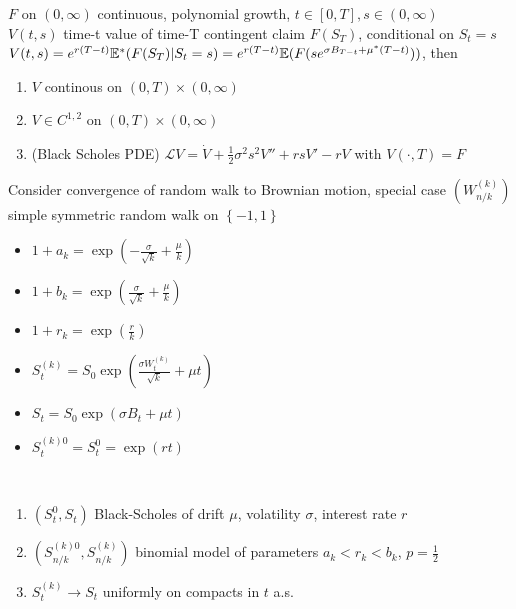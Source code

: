 \begin{prop}
    $F$ on $(0, \infty)$ continuous, polynomial growth, $t \in [0, T], s \in (0, \infty)$ \\
    $V(t, s)$ time-t value of time-T contingent claim $F(S_T)$, conditional on $S_t = s$\\
    $V(t, s) = e^{r (T - t)}\mathbb{E}^*(F(S_T)|S_t = s) = e^{r(T - t)} \mathbb{E}(F(se^{\sigma B_{T-t} + \mu^*(T-t)}))$, then
    \begin{enumerate}
        \item $V$ continous on $(0, T) \times (0, \infty)$
        \item $V \in C^{1,2}$ on $(0, T) \times (0, \infty)$
        \item (Black Scholes PDE) $\mathcal{L}V = \dot{V} + \frac{1}{2} \sigma^2 s^2 V'' + rsV' - rV$ with $V(\cdot, T) = F$
    \end{enumerate}
\end{prop}

\begin{setting}
    Consider convergence of random walk to Brownian motion, special case $(W_{n/k}^{(k)})$ simple symmetric random walk on $\left\{ -1, 1 \right\}$
\end{setting}

\begin{itemize}
    \item $1 + a_k = \exp\left( -\frac{\sigma}{\sqrt{k}} + \frac{\mu}{k} \right)$
    \item $1 + b_k = \exp\left( \frac{\sigma}{\sqrt{k}} + \frac{\mu}{k} \right)$
    \item $1 + r_k = \exp\left( \frac{r}{k} \right)$
    \item $S_t^{(k)} = S_0\exp\left( \frac{\sigma W_t^{(k)}}{\sqrt{k}} + \mu t \right)$
    \item $S_t = S_0 \exp\left( \sigma B_t + \mu t \right)$
    \item $S_t^{(k)0} = S_t^0 = \exp(rt)$
\end{itemize}

\begin{fact}\,
    \begin{enumerate}
        \item $(S_t^0, S_t)$ Black-Scholes of drift $\mu$, volatility $\sigma$, interest rate $r$
        \item $(S_{n/k}^{(k)0}, S_{n/k}^{(k)})$ binomial model of parameters $a_k < r_k < b_k$, $p = \frac{1}{2}$
        \item $S_t^{(k)} \rightarrow S_t$ uniformly on compacts in $t$ a.s.
    \end{enumerate}
\end{fact}


